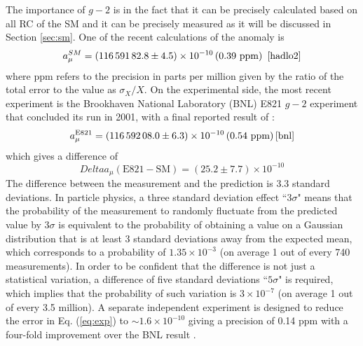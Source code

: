 \documentclass{outhesis}
\begin{document}
The importance of $g-2$ is in the fact that it can be precisely calculated based on all RC of the SM and it can be precisely measured as it will be discussed in Section \ref{sec:sm}. One of the recent calculations of the anomaly is
\begin{equation}
a_{\mu}^{SM} = \left(116\, 591\, 82.8 \pm 4.5\right) \times 10^{-10} \left(0.39  \text{ ppm}\right)  \,\,\cite{hadlo2}
\label{eq:sm}
\end{equation}
where ppm refers to the precision in parts per million given by the ratio of the total error to the value as $\sigma_X/X$. 
On the experimental side, the most recent experiment is the Brookhaven National Laboratory (BNL) E821 $g-2$ experiment that concluded its run in 2001, with a final reported result of \cite{bnl}:
\begin{equation}
a_{\mu}^{\text{E821}} = \left(116\, 592\, 08.0 \pm 6.3\right) \times 10^{-10} \left(0.54  \text{ ppm}\right) \cite{bnl}
\label{eq:exp}
\end{equation}
which gives a difference of 
\begin{equation}
Delta a_{\mu} \left(\text{E821} - \text{SM} \right) = \left(25.2 \pm 7.7\right) \times 10^{-10}  
\label{eq:diff}
\end{equation}
The difference between the measurement and the prediction is 3.3 standard deviations. In particle physics, a three standard deviation effect ``$3\sigma$" means that the probability of the measurement to randomly fluctuate from the predicted value by $3\sigma$ is equivalent to the probability of obtaining a value on a Gaussian distribution that is at least 3 standard deviations away from the expected mean, which corresponds to a probability of $1.35 \times 10^{-3}$ (on average 1 out of every 740 measurements). In order to be confident that the difference is not just a statistical variation, a difference of five standard deviations ``$5\sigma$" is required, which implies that the probability of such variation is $3 \times 10^{-7}$ (on average 1 out of every 3.5 million).  A separate independent experiment is designed to reduce the error in Eq. (\ref{eq:exp}) to $\sim 1.6 \times 10^{-10}$ giving a precision of 0.14 ppm with a four-fold improvement over the BNL result \cite{bnl}.
\end{document}
